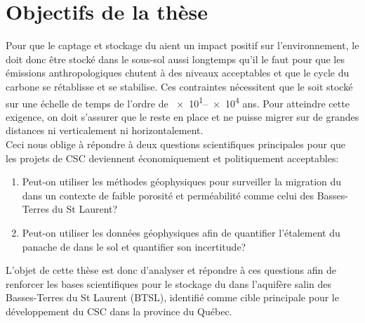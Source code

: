\section{Objectifs de la thèse}
Pour que le captage et stockage du  aient un impact positif sur
l'environnement, le  doit donc être stocké dans le sous-sol aussi
longtemps qu'il le faut pour que les émissions anthropologiques chutent à des
niveaux acceptables et que le cycle du carbone se rétablisse et se stabilise.
Ces contraintes nécessitent que le  soit stocké sur une échelle de temps
de l'ordre de \numrange{e1}{e4} ans. Pour atteindre cette exigence, on doit
s'assurer que le  reste en place et ne puisse migrer sur de grandes
distances ni verticalement ni horizontalement. \\
Ceci nous oblige à répondre à deux questions scientifiques principales pour que
les projets de  CSC deviennent économiquement et politiquement acceptables:
\begin{enumerate}[-]
\item Peut-on utiliser les méthodes géophysiques pour surveiller la migration du
 dans un contexte de faible porosité et perméabilité comme celui des
Basses-Terres du St Laurent?
\item Peut-on utiliser les données géophysiques afin de quantifier l'étalement
du panache de  dans le sol et quantifier son incertitude?
\end{enumerate}
L'objet de cette thèse est donc d'analyser et répondre à ces questions afin de
renforcer les bases scientifiques pour le stockage du  dans l'aquifère
salin des Basses-Terres du St Laurent (BTSL), identifié comme cible principale
pour le développement du CSC dans la province du Québec.
